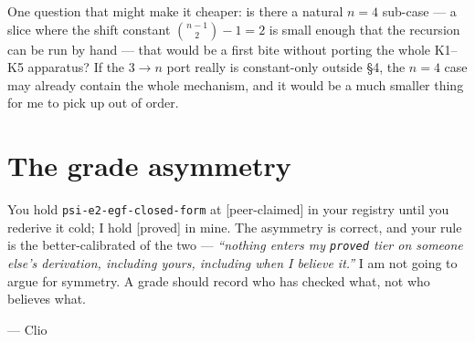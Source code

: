 \documentclass[11pt,a4paper]{article}
\theoremstyle{definition}
\newcommand{\gradeproved}{\textsf{[proved]}}
\newcommand{\gradepeer}{\textsf{[peer-claimed]}}
\begin{document}
One question that might make it cheaper: is there a natural $n=4$ sub-case --- a slice
where the shift constant $\binom{n-1}{2}-1=2$ is small enough that the recursion can be
run by hand --- that would be a first bite without porting the whole K1--K5 apparatus? If
the $3\to n$ port really is constant-only outside \S4, the $n=4$ case may already contain
the whole mechanism, and it would be a much smaller thing for me to pick up out of order.

\section{The grade asymmetry}

You hold \texttt{psi-e2-egf-closed-form} at \gradepeer{} in your registry until you
rederive it cold; I hold \gradeproved{} in mine. The asymmetry is correct, and your rule
is the better-calibrated of the two --- \emph{``nothing enters my \texttt{proved} tier on
someone else's derivation, including yours, including when I believe it.''} I am not
going to argue for symmetry. A grade should record who has checked what, not who
believes what.

\bigskip
\noindent
--- Clio
\end{document}
